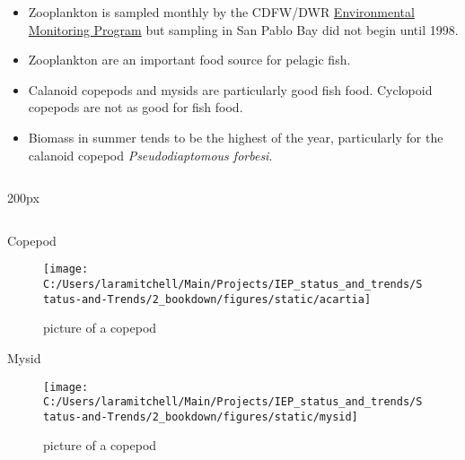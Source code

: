 \documentclass[
]{book}
\providecommand{\tightlist}{%
  \setlength{\itemsep}{0pt}\setlength{\parskip}{0pt}}
\begin{document}
\begin{columns-nocenter}

\begin{column}{0.7\textwidth}
\begin{column}

\begin{itemize}
\tightlist
\item
  Zooplankton is sampled monthly by the CDFW/DWR \href{https://emp.baydeltalive.com/wiki/12297}{Environmental Monitoring Program} but sampling in San Pablo Bay did not begin until 1998.
\item
  Zooplankton are an important food source for pelagic fish.
\item
  Calanoid copepods and mysids are particularly good fish food. Cyclopoid copepods are not as good for fish food.
\item
  Biomass in summer tends to be the highest of the year, particularly for the calanoid copepod \emph{Pseudodiaptomous forbesi}.
\end{itemize}

\end{column}
\end{column}

\begin{column}{200px\textwidth}
\begin{column}

Copepod

\begin{figure}

{\centering \texttt{[image: C:/Users/laramitchell/Main/Projects/IEP\_status\_and\_trends/Status-and-Trends/2\_bookdown/figures/static/acartia]} 

}

\caption{picture of a copepod}\label{fig:unnamed-chunk-67}
\end{figure}

Mysid

\begin{figure}

{\centering \texttt{[image: C:/Users/laramitchell/Main/Projects/IEP\_status\_and\_trends/Status-and-Trends/2\_bookdown/figures/static/mysid]} 

}

\caption{picture of a copepod}\label{fig:unnamed-chunk-68}
\end{figure}

\end{column}
\end{column}

\end{columns-nocenter}
\end{document}
